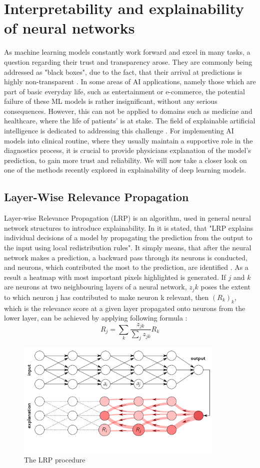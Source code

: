 \section{Interpretability and explainability of neural networks}
As machine learning models constantly work forward and excel in many tasks, a question regarding their trust and transparency arose. They are commonly being addressed as "black boxes", due to the fact, that their arrival at predictions is highly non-transparent \cite{explainDLbook}. In some areas of AI applications, namely those which are part of basic everyday life, such as entertainment or e-commerce, the potential failure of these ML models is rather insignificant, without any serious consequences. However, this can not be applied to domains such as medicine and healthcare, where the life of patients' is at stake. The field of explainable artificial intelligence is dedicated to addressing this challenge \cite{explainDLbook}. For implementing AI models into clinical routine, where they usually maintain a supportive role in the diagnostics process, it is crucial to provide physicians explanation of the model's prediction, to gain more trust and reliability. We will now take a closer look on one of the methods recently explored in explainability of deep learning models.
\subsection{Layer-Wise Relevance Propagation}
Layer-wise Relevance Propagation (LRP) is an algorithm, used in general neural network structures to introduce explainability. In \cite{explainDLbook} it is stated, that "LRP explains individual decisions of a model by propagating the prediction from the output to the input using local redistribution rules". It simply means, that after the neural network makes a prediction, a backward pass through its neurons is conducted, and neurons, which contributed the most to the prediction, are identified \cite{explainDLbook}. As a result a heatmap with most important pixels highlighted is generated.
If $j$ and $k$ are neurons at two neighbouring layers of a neural network, $z_jk$ poses the extent to which neuron j has contributed to make neuron k relevant, then $(R_k)_k$, which is the relevance score at a given layer propagated onto neurons from the lower layer, can be achieved by applying following formula \cite{explainDLbook}:
\begin{equation}
 R_j = \sum _k \frac{z_{jk}}{\sum _{j} z_{jk}} R_k   
\end{equation}

\begin{figure}[!ht]
\centering
\includegraphics[width=10cm]{assets/images/LRP}
\caption[The LRP procedure]{The LRP procedure \protect\footnotemark}
\end{figure}



